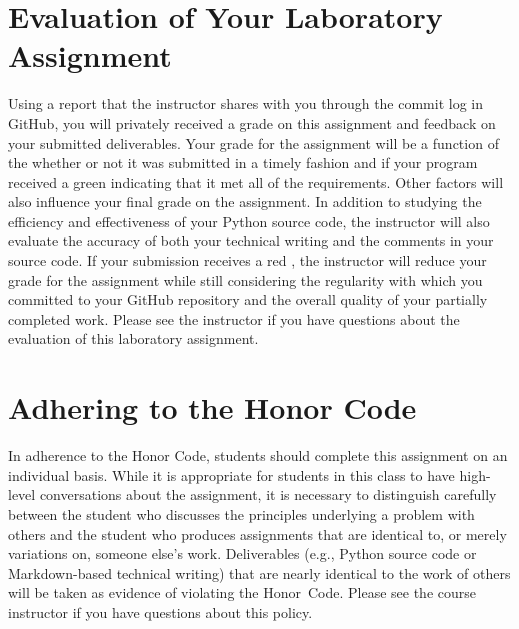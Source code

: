 \documentclass[11pt]{article}
\newcommand{\checkmark}{\ding{51}}
\newcommand{\naughtmark}{\ding{55}}
\begin{document}
\section*{Evaluation of Your Laboratory Assignment}

Using a report that the instructor shares with you through the commit log in GitHub, you will privately received a grade
on this assignment and feedback on your submitted deliverables. Your grade for the assignment will be a function of the
whether or not it was submitted in a timely fashion and if your program received a green \checkmark{} indicating that it
met all of the requirements. Other factors will also influence your final grade on the assignment. In addition to
studying the efficiency and effectiveness of your Python source code, the instructor will also evaluate the accuracy of
both your technical writing and the comments in your source code. If your submission receives a red \naughtmark{}, the
instructor will reduce your grade for the assignment while still considering the regularity with which you committed to
your GitHub repository and the overall quality of your partially completed work. Please see the instructor if you have
questions about the evaluation of this laboratory assignment.

\section*{Adhering to the Honor Code}

In adherence to the Honor Code, students should complete this assignment on an individual basis. While it is appropriate
for students in this class to have high-level conversations about the assignment, it is necessary to distinguish
carefully between the student who discusses the principles underlying a problem with others and the student who produces
assignments that are identical to, or merely variations on, someone else's work. Deliverables (e.g., Python source code
or Markdown-based technical writing) that are nearly identical to the work of others will be taken as evidence of
violating the \mbox{Honor Code}. Please see the course instructor if you have questions about this policy.
\end{document}
